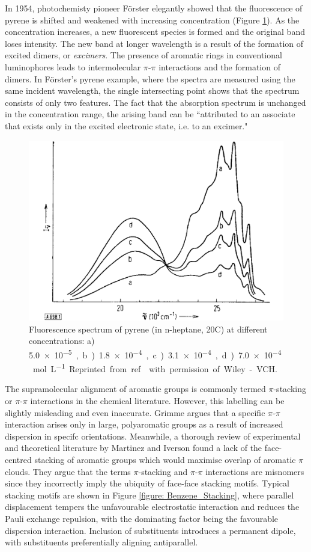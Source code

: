 In 1954, photochemisty pioneer  F\"{o}rster elegantly showed that the fluorescence of pyrene is shifted and weakened with increasing concentration (Figure \ref{figure: Forster_Spectra}).\cite{Forster1954,Forster1969} As the concentration increases, a new fluorescent species is formed and the original band loses intensity. The new band at longer wavelength is a result of the formation of excited dimers, or \textit{excimers}. The presence of aromatic rings in conventional luminophores leads to intermolecular $\pi$-$\pi$ interactions and the formation of dimers. In F\"{o}rster's pyrene example, where the spectra are measured using the same incident wavelength, the single intersecting point shows that the spectrum consists of only two features. The fact that the absorption spectrum is unchanged in the concentration range, the arising band can be ``attributed to an associate that exists only in the excited electronic state, i.e. to an excimer."\cite{Forster1969}
\begin{figure}[H]
\centering
  \includegraphics[width=0.6\linewidth]{Intro/Forster_Spectra.pdf}
  \caption[Fluorescence spectrum of pyrene]{Fluorescence spectrum of pyrene (in n-heptane, 20\degree{}C) at different concentrations: a) \SI{5.0e-5}, b) \SI{1.8e-4}, c) \SI{3.1e-4}, d) \SI{7.0e-4}{mol L^{-1}}. Reprinted from ref.~ with permission of Wiley-VCH.}
  \label{figure: Forster_Spectra}
\end{figure}
The supramolecular alignment of aromatic groups is commonly termed $\pi$-stacking or $\pi$-$\pi$ interactions in the chemical literature. However, this labelling can be slightly misleading and even inaccurate.\cite{Grimme2008,Martinez2012} Grimme argues that a specific $\pi$-$\pi$interaction arises only in large, polyaromatic groups as a result of increased dispersion in specifc orientations.\cite{Grimme2008} Meanwhile, a thorough review of experimental and theoretical literature by Martinez and Iverson found a lack of the face-centred stacking of aromatic groups which would maximise overlap of aromatic $\pi$ clouds.\cite{Martinez2012} They argue that the terms $\pi$-stacking and $\pi$-$\pi$ interactions are misnomers since they incorrectly imply the ubiquity of face-face stacking motifs. Typical stacking motifs are shown in Figure \ref{figure: Benzene_Stacking}, where parallel displacement tempers the unfavourable electrostatic interaction and reduces the Pauli exchange repulsion, with the dominating factor being the favourable dispersion interaction. Inclusion of substituents introduces a permanent dipole, with substituents preferentially aligning antiparallel.\cite{Martinez2012}

